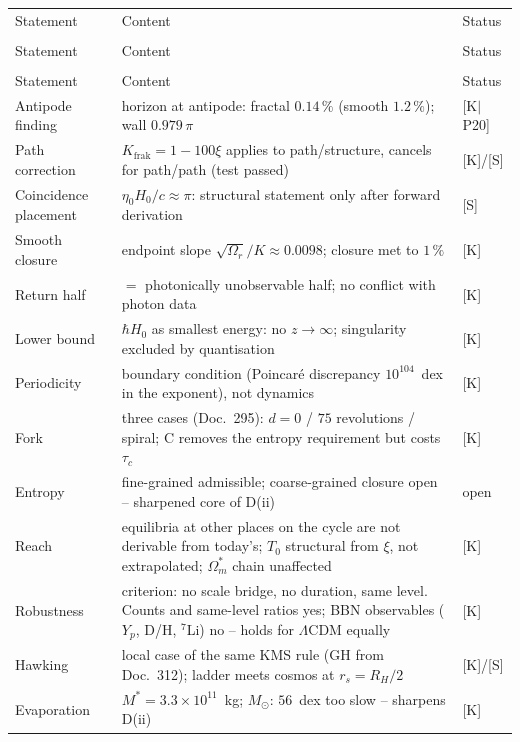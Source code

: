 \documentclass[11pt]{report}
\begin{document}
{\small
\begin{longtable}{lp{6.4cm}l}
\toprule
Statement & Content & Status \\\\
\midrule
\endfirsthead
\toprule
Statement & Content & Status \\\\
\midrule
\endhead
\bottomrule
\endfoot

Statement & Content & Status \\
\midrule
Antipode finding & horizon at antipode: fractal $0.14\,\%$
  (smooth $1.2\,\%$); wall $0.979\,\pi$ & [K$|$P20] \\
Path correction & $K_\text{frak} = 1-100\xi$ applies to
  path/structure, cancels for path/path (test passed) & [K]/[S] \\
Coincidence placement & $\eta_0 H_0/c \approx \pi$: structural
  statement only after forward derivation & [S] \\
Smooth closure & endpoint slope $\sqrt{\Omega_r}/K \approx 0.0098$;
  closure met to $1\,\%$ & [K] \\
Return half & $=$ photonically unobservable half; no conflict
  with photon data & [K] \\
Lower bound & $\hbar H_0$ as smallest energy: no $z\to\infty$;
  singularity excluded by quantisation & [K] \\
Periodicity & boundary condition (Poincaré discrepancy
  $10^{104}$~dex in the exponent), not dynamics & [K] \\
Fork & three cases (Doc.~295): $d=0$ / $75$ revolutions / spiral;
  C removes the entropy requirement but costs $\tau_c$ & [K] \\
Entropy & fine-grained admissible; coarse-grained closure open --
  sharpened core of D(ii) & open \\
Reach & equilibria at other places on the cycle are not derivable
  from today's; $T_0$ structural from $\xi$, not extrapolated;
  $\Omega_m^{*}$ chain unaffected & [K] \\
Robustness & criterion: no scale bridge, no duration, same level.
  Counts and same-level ratios yes; BBN observables ($Y_p$, D/H,
  ${}^7$Li) no -- holds for $\Lambda$CDM equally & [K] \\
Hawking & local case of the same KMS rule (GH from Doc.~312);
  ladder meets cosmos at $r_s = R_H/2$ & [K]/[S] \\
Evaporation & $M^{*} = 3.3\times10^{11}$~kg; $M_\odot$: $56$~dex
  too slow -- sharpens D(ii) & [K] \\

\end{longtable}}
\end{document}
